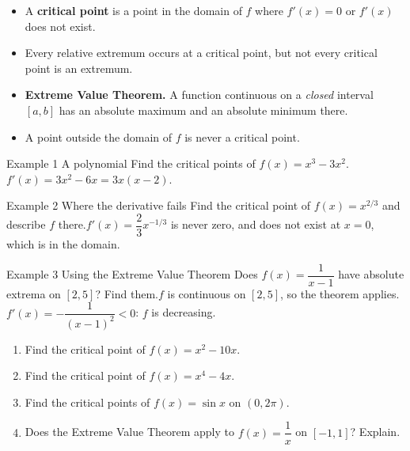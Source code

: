 \documentclass[11pt]{article}
\begin{document}

\begin{ideabox}
\begin{itemize}[leftmargin=*,itemsep=2pt,topsep=2pt]
  \item A \textbf{critical point} is a point in the domain of $f$ where $f'(x)=0$ or $f'(x)$ does not exist.
  \item Every relative extremum occurs at a critical point, but not every critical point is an extremum.
  \item \textbf{Extreme Value Theorem.} A function continuous on a \emph{closed} interval $[a,b]$ has an absolute maximum and an absolute minimum there.
  \item A point outside the domain of $f$ is never a critical point.
\end{itemize}
\end{ideabox}

\begin{example}{Example 1 \textperiodcentered{} A polynomial}
Find the critical points of $f(x)=x^3-3x^2$.\soln $f'(x)=3x^2-6x=3x(x-2)$.
\end{example}

\begin{example}{Example 2 \textperiodcentered{} Where the derivative fails}
Find the critical point of $f(x)=x^{2/3}$ and describe $f$ there.\soln $f'(x)=\dfrac23x^{-1/3}$ is never zero, and does not exist at $x=0$, which is in the domain.
\end{example}

\begin{example}{Example 3 \textperiodcentered{} Using the Extreme Value Theorem}
Does $f(x)=\dfrac{1}{x-1}$ have absolute extrema on $[2,5]$? Find them.\soln $f$ is continuous on $[2,5]$, so the theorem applies. $f'(x)=-\dfrac{1}{(x-1)^2}<0$: $f$ is decreasing.
\end{example}

\newpage
{}

\begin{enumerate}[leftmargin=*,itemsep=2pt]
  \item Find the critical point of $f(x)=x^2-10x$.\work{2.3cm}
  \item Find the critical point of $f(x)=x^4-4x$.\work{2.3cm}
  \item Find the critical points of $f(x)=\sin x$ on $(0,2\pi)$.\work{2.3cm}
  \item Does the Extreme Value Theorem apply to $f(x)=\dfrac1x$ on $[-1,1]$? Explain.\work{2.3cm}
\end{enumerate}
\end{document}
